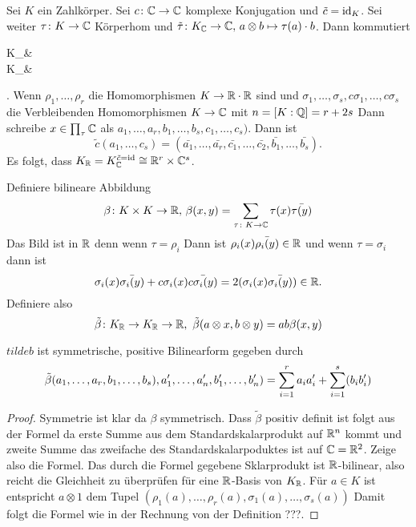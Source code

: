 \begin{Bem} Sei \(K\) ein Zahlkörper.
	Sei \(c\colon \mathbb{C}\to\mathbb{C}\) komplexe Konjugation und \(\tilde c=\mathrm{id}_K\). Sei weiter \(\tau\colon K\to \mathbb{C}\) Körperhom und \(\tilde\tau\colon K_{\mathbb{C}}\to \mathbb{C},\, a\otimes b\mapsto \tau(a)\cdot b\).
	Dann kommutiert
	\begin{tikzfigure}
		K_\CC \arrow[d, "\tilde c"]  & \CC \arrow[d, "c"] \\
		K_\CC {}              & \CC               
	\end{tikzfigure}.
	Wenn \(\rho_1,\dots,\rho_r\) die Homomorphismen \(K\to\mathbb{R}\cdot \mathbb{R}\) sind und \(\sigma_1,\dots,\sigma_s, c\sigma_1,\dots,c\sigma_s\) die Verbleibenden Homomorphismen \(K\to \mathbb{C}\) mit \(n=[K:\mathbb{Q}]=r+2s\)
	Dann schreibe \(x\in\prod_\tau \mathbb{C}\) als 
	\(a_1,\dots,a_r,b_1,\dots,b_s,c_1,\dots,c_s)\).
	Dann ist 
	\[\tilde c (a_1,\dots,c_s)=(\bar{a_1},\dots,\bar{a_r},\bar{c_1},\dots,\bar{c_2},\bar{b_1},\dots,\bar{b_s}).\]
	Es folgt, dass \(K_{\mathbb{R}}=K_{\mathbb{C}}^{\tilde c=\mathrm{id}}\cong \mathbb{R}^r\times \mathbb{C}^s\).
\end{Bem}
\begin{Def}
	Definiere bilineare Abbildung 
	\[\beta\colon K\times K\to \mathbb{R},\, \beta(x,y)=\sum_{\tau\colon K\to\mathbb{C}}\tau(x)\bar{\tau(y)}\]
	Das Bild ist in \(\mathbb{R}\) denn wenn \(\tau=\rho_i\)
	Dann ist \(\rho_i(x)\bar{\rho_i(y)}\in \mathbb{R}\)
	und wenn \(\tau=\sigma_i\) dann ist
	\[\sigma_i(x)\bar{\sigma_i(y)}+c\sigma_i(x)\bar{c\sigma_i(y)}=2\real(\sigma_i(x)\bar{\sigma_i(y)})\in \RR.\]
	Definiere also 
	\[\tilde\beta\colon K_{\mathbb{R}}\to K_{\mathbb{R}}\to \mathbb{R},\ \tilde \beta(a\otimes x,b\otimes y)=ab\beta(x,y)\]
\end{Def}
\begin{Lemma}
	\(tilde b\) ist symmetrische, positive Bilinearform gegeben durch 
	\[\tilde\beta(a_1,\dots,a_r,b_1,\dots,b_s ),a'_1,\dots,a'_n,b'_1,\dots,b'_n)=\sum_{i=1}^ra_ia'_i+\sum_{i=1}^s\real(b_ib'_i)\]
\end{Lemma}
\begin{proof}
	Symmetrie ist klar da \(\beta\) symmetrisch.
	Dass \(\tilde\beta\) positiv definit ist folgt aus der Formel da erste Summe aus dem Standardskalarprodukt auf \(\mathbb{R}^n\) kommt und zweite Summe das zweifache des Standardskalarpoduktes ist auf \(\mathbb{C}=\mathbb{R}^2\).
	Zeige also die Formel.
	Das durch die Formel gegebene Sklarprodukt ist \(\mathbb{R}\)-bilinear, also reicht die Gleichheit zu überprüfen für eine \(\mathbb{R}\)-Basis von \(K_{\mathbb{R}}\).
	Für \(a\in K\) ist entspricht \(a\otimes 1\) dem Tupel
	\((\rho_1(a),\dots,\rho_r(a),\sigma_1(a),\dots,\sigma_s(a))\)
	Damit folgt die Formel wie in der Rechnung von der Definition ???.
\end{proof}
